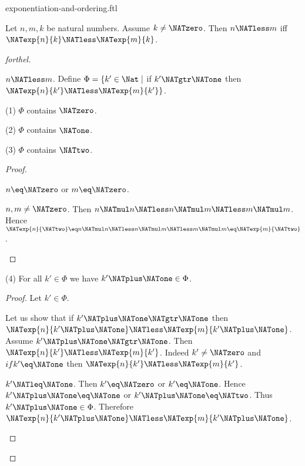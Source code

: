 \documentclass{naproche-library}
\begin{document}
\begin{smodule}[title=Exponentiation and Ordering]{exponentiation-and-ordering.ftl}

\begin{proposition}[forthel,id=ARITHMETIC_09_3373702288769024]
  Let $n, m, k$ be natural numbers.
  Assume $k \neq \NATzero$.
  Then $n \NATless m$ iff $\NATexp{n}{k} \NATless \NATexp{m}{k}$.
\end{proposition}
\begin{proof}[forthel]
  \begin{case}{$n \NATless m$.}
    Define $\Phi = \{ k' \in \Nat \mid$ if $k' \NATgtr \NATone$ then $\NATexp{n}{k'} \NATless \NATexp{m}{k'} \}$.

    (1) $\Phi$ contains $\NATzero$.

    (2) $\Phi$ contains $\NATone$.

    (3) $\Phi$ contains $\NATtwo$.
    \begin{proof}
      \begin{case}{$n \eq \NATzero$ or $m \eq \NATzero$.} \end{case}

      \begin{case}{$n, m \neq \NATzero$.}
        Then $n \NATmul n
          \NATless n \NATmul m
          \NATless m \NATmul m$.
        Hence $\NATexp{n}{\NATtwo}
          \eq n \NATmul n
          \NATless n \NATmul m
          \NATless m \NATmul m
          \eq \NATexp{m}{\NATtwo}$.
      \end{case}
    \end{proof}

    (4) For all $k' \in \Phi$ we have $k' \NATplus \NATone \in \Phi$.
    \begin{proof}
      Let $k' \in \Phi$.

      Let us show that if $k' \NATplus \NATone \NATgtr \NATone$ then $\NATexp{n}{k' \NATplus \NATone} \NATless \NATexp{m}{k' \NATplus \NATone}$.
        Assume $k' \NATplus \NATone \NATgtr \NATone$.
        Then $\NATexp{n}{k'} \NATless \NATexp{m}{k'}$.
        Indeed $k' \neq \NATzero$ and $if k' \eq \NATone$ then $\NATexp{n}{k'} \NATless \NATexp{m}{k'}$.

        \begin{case}{$k' \NATleq \NATone$.}
          Then $k' \eq \NATzero$ or $k' \eq \NATone$.
          Hence $k' \NATplus \NATone \eq \NATone$ or $k' \NATplus \NATone \eq \NATtwo$.
          Thus $k' \NATplus \NATone \in \Phi$.
          Therefore $\NATexp{n}{k' \NATplus \NATone} \NATless \NATexp{m}{k' \NATplus \NATone}$.
        \end{case}


\end{proof}
\end{case}
\end{proof}
\end{smodule}
\end{document}
